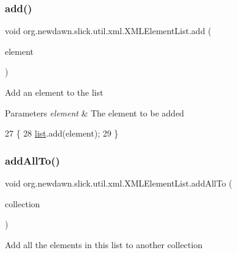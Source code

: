 \subsubsection{\texorpdfstring{add()}{add()}}
{\footnotesize\ttfamily void org.\+newdawn.\+slick.\+util.\+xml.\+X\+M\+L\+Element\+List.\+add (\begin{DoxyParamCaption}\item[{\mbox{\hyperlink{classorg_1_1newdawn_1_1slick_1_1util_1_1xml_1_1_x_m_l_element}{X\+M\+L\+Element}}}]{element }\end{DoxyParamCaption})\hspace{0.3cm}{\ttfamily [inline]}}

Add an element to the list


\begin{DoxyParams}{Parameters}
{\em element} & The element to be added \\
\hline
\end{DoxyParams}

\begin{DoxyCode}
27                                         \{
28         \mbox{\hyperlink{classorg_1_1newdawn_1_1slick_1_1util_1_1xml_1_1_x_m_l_element_list_ade4a37ed92cf6392dbea3cdc9d9e6a6f}{list}}.add(element);
29     \}
\end{DoxyCode}
\mbox{\label{classorg_1_1newdawn_1_1slick_1_1util_1_1xml_1_1_x_m_l_element_list_a0a52b054275544bda4c8efb625aff278}} 
\subsubsection{\texorpdfstring{add\+All\+To()}{addAllTo()}}
{\footnotesize\ttfamily void org.\+newdawn.\+slick.\+util.\+xml.\+X\+M\+L\+Element\+List.\+add\+All\+To (\begin{DoxyParamCaption}\item[{Collection}]{collection }\end{DoxyParamCaption})\hspace{0.3cm}{\ttfamily [inline]}}

Add all the elements in this list to another collection


